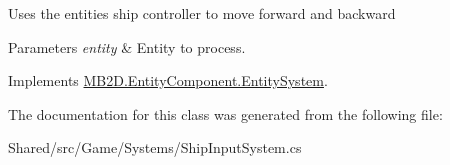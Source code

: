 Uses the entities ship controller to move forward and backward 


\begin{DoxyParams}{Parameters}
{\em entity} & Entity to process.\\
\hline
\end{DoxyParams}


Implements \hyperlink{class_m_b2_d_1_1_entity_component_1_1_entity_system_abbf83b87cb5d12754fb058cef50451fa}{M\+B2\+D.\+Entity\+Component.\+Entity\+System}.



The documentation for this class was generated from the following file\+:\begin{DoxyCompactItemize}
\item 
Shared/src/\+Game/\+Systems/Ship\+Input\+System.\+cs\end{DoxyCompactItemize}
